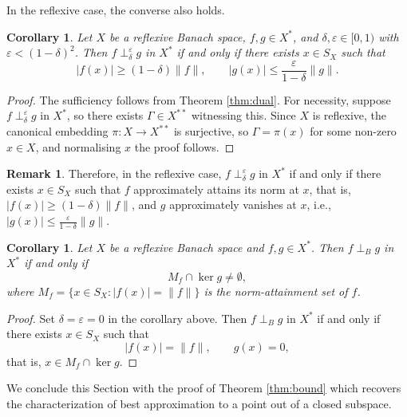 \documentclass[11pt, reqno]{amsart}
\newtheorem{corollary}[theorem]{Corollary}
\theoremstyle{definition}
\newtheorem{remark}[theorem]{Remark}
\begin{document}
\noindent In the reflexive case, the converse also holds.

\begin{corollary}\label{cor:reflexdual}
Let $X$ be a reflexive Banach space, $f, g \in X^*$, and $\delta, \varepsilon \in 
[0,1)$ with $\varepsilon < (1-\delta)^2$. Then $f \perp_\delta^\varepsilon g$ in 
$X^*$ if and only if there exists $x \in  S_X$ such that
\[
|f(x)| \geq (1-\delta)\|f\|, \qquad |g(x)| \leq \frac{\varepsilon}{1-\delta}\|g\|.
\]
\end{corollary}

\begin{proof}
The sufficiency follows from Theorem \ref{thm:dual}. For necessity, suppose 
$f \perp_\delta^\varepsilon g$ in $X^*$, so there exists $\Gamma \in X^{**}$ 
witnessing this. Since $X$ is reflexive, the canonical embedding 
$\pi: X \to X^{**}$ is surjective, so $\Gamma = \pi(x)$ for some 
 non-zero $x \in X$, and  normalising $x$ the proof follows.
\end{proof}

\begin{remark}
Therefore, in the reflexive case, $f \perp_\delta^\varepsilon g$ in $X^*$ if and only if there exists $x \in S_X$ such that $f$ approximately attains its norm at $x$, that is, 
$|f(x)| \geq (1-\delta)\|f\|$, and $g$ approximately vanishes at $x$, i.e., 
$|g(x)| \leq \frac{\varepsilon}{1-\delta}\|g\|$.
\end{remark}

\begin{corollary}
Let $X$ be a reflexive Banach space and $f, g \in X^*$. Then $f \perp_B g$ in 
$X^*$ if and only if
\[
M_f \cap \ker g \neq \emptyset,
\]
where $M_f = \{x \in S_X : |f(x)| = \|f\|\}$ is the norm-attainment set of $f$.
\end{corollary}

\begin{proof}
Set $\delta = \varepsilon = 0$ in the corollary above. Then $f \perp_B g$ in 
$X^*$ if and only if there exists $x \in S_X$ such that
\[
|f(x)| = \|f\|, \qquad g(x) = 0,
\]
that is, $x \in M_f \cap \ker g$.
\end{proof}

\noindent We conclude this Section with the proof of Theorem \ref{thm:bound} which recovers  the characterization of best approximation to a point out of a closed subspace.
\end{document}
